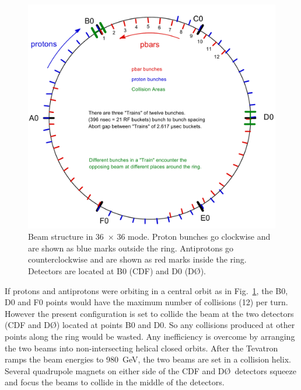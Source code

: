 \begin{figure}[htbm]
 \centering
 \includegraphics[scale=0.4,keepaspectratio=true]{./BunchStructure.png}
\caption{Beam structure in 36~$\times$ 36 mode. Proton bunches go clockwise and are shown as blue marks outside the ring. Antiprotons go counterclockwise and are shown as red marks inside the ring. Detectors are located at B0 (CDF) and D0 (D\O).}
 \label{fig:BeamStructure}
\end{figure}
\vspace{-0.015\textheight}
If protons and antiprotons were orbiting in a central orbit as in Fig.~\ref{fig:BeamStructure}, the B0, D0 and F0 points would have the maximum number of collisions (12) per turn. However the present configuration is set to collide the beam at the two detectors (CDF and D\O) located at points B0 and D0. So any collisions produced at other points along the ring would be wasted. Any inefficiency is overcome by arranging the two beams into non-intersecting helical closed orbits. After the Tevatron ramps the beam energies to 980~GeV, the two beams are set in a collision helix. Several quadrupole magnets on either side of the CDF and D\O\ detectors squeeze and focus the beams to collide in the middle of the detectors.

